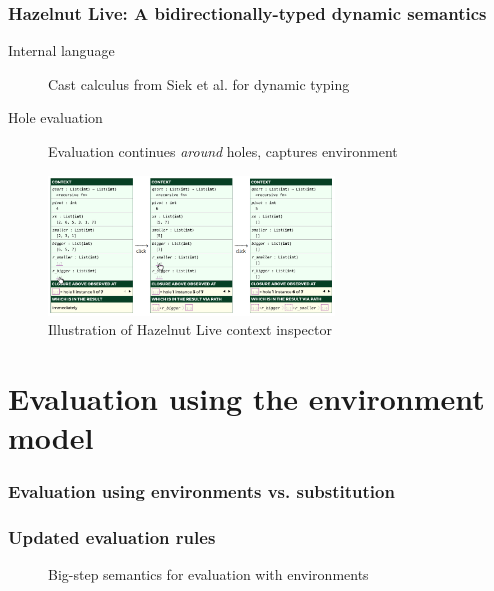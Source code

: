 \documentclass{beamer}
\begin{document}
\begin{frame}
  \frametitle{Hazelnut Live: A bidirectionally-typed dynamic semantics}

  \begin{description}
  \item[Internal language] Cast calculus from Siek et al. \cite{Siek06gradualtyping,siek2015refined} for dynamic typing
  \item[Hole evaluation] Evaluation continues \textit{around} holes, captures environment
  \end{description}
  
  \begin{figure}
    \centering
    \includegraphics[height=10em]{thesis/img/hazelnut_live_context_inspector}
    \caption{Illustration of Hazelnut Live context inspector \cite{conf/popl/HazelnutLive19}}
    \label{fig:hazelnut-live-context-inspector}
  \end{figure}
\end{frame}

\section{Evaluation using the environment model}

\begin{frame}
  \frametitle{Evaluation using environments vs. substitution}

\end{frame}

\begin{frame}
  \frametitle{Updated evaluation rules}


  \begin{figure}
    \footnotesize
    \centering
    
    \caption{Big-step semantics for evaluation with environments}
    \label{fig:eval-env-rules}
  \end{figure}
\end{frame}
\end{document}
